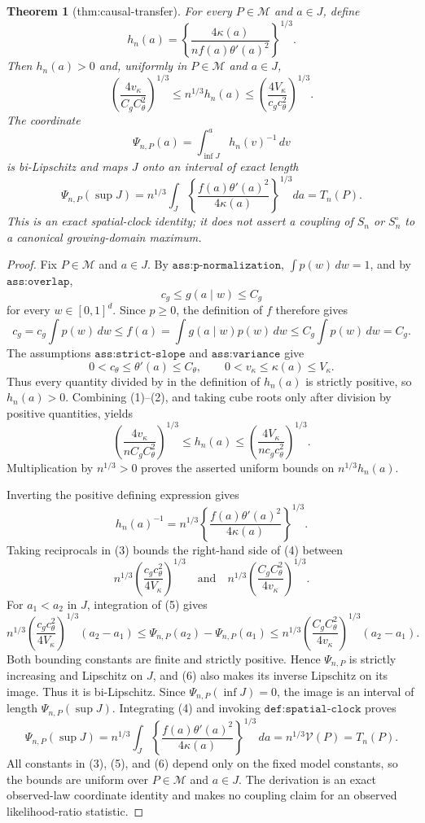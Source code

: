 \documentclass{article}
\newtheorem{theorem}{Theorem}
\begin{document}
\begin{theorem}[thm:causal-transfer]\label{thm:causal-transfer}
For every \(P\in\mathcal M\) and \(a\in J\), define
\[
 h_n(a)=\left\{\frac{4\kappa(a)}{n f(a)\theta'(a)^2}\right\}^{1/3}.
\]
Then \(h_n(a)>0\) and, uniformly in \(P\in\mathcal M\) and \(a\in J\),
\[
 \left(\frac{4v_\kappa}{C_gC_\theta^2}\right)^{1/3}
 \le n^{1/3}h_n(a)
 \le
 \left(\frac{4V_\kappa}{c_gc_\theta^2}\right)^{1/3}.
\]
The coordinate
\[
 \Psi_{n,P}(a)=\int_{\inf J}^{a}h_n(v)^{-1}\,dv
\]
is bi-Lipschitz and maps \(J\) onto an interval of exact length
\[
 \Psi_{n,P}(\sup J)=n^{1/3}\int_J
 \left\{\frac{f(a)\theta'(a)^2}{4\kappa(a)}\right\}^{1/3}da
 =T_n(P).
\]
This is an exact spatial-clock identity; it does not assert a coupling of \(S_n\) or \(S_n^\circ\) to a canonical growing-domain maximum.
\end{theorem}
\begin{proof}
Fix \(P\in\mathcal M\) and \(a\in J\).  By \(\texttt{ass:p-normalization}\), \(\int p(w)\,dw=1\), and by \(\texttt{ass:overlap}\),
\[
 c_g\le g(a\mid w)\le C_g
\]
for every \(w\in[0,1]^d\).  Since \(p\ge0\), the definition of \(f\) therefore gives
\[
 c_g=c_g\int p(w)\,dw
 \le f(a)=\int g(a\mid w)p(w)\,dw
 \le C_g\int p(w)\,dw=C_g. \tag{1}
\]
The assumptions \(\texttt{ass:strict-slope}\) and \(\texttt{ass:variance}\) give
\[
 0<c_\theta\le\theta'(a)\le C_\theta,
 \qquad
 0<v_\kappa\le\kappa(a)\le V_\kappa. \tag{2}
\]
Thus every quantity divided by in the definition of \(h_n(a)\) is strictly positive, so \(h_n(a)>0\).  Combining (1)--(2), and taking cube roots only after division by positive quantities, yields
\[
 \left(\frac{4v_\kappa}{nC_gC_\theta^2}\right)^{1/3}
 \le h_n(a)\le
 \left(\frac{4V_\kappa}{nc_gc_\theta^2}\right)^{1/3}. \tag{3}
\]
Multiplication by \(n^{1/3}>0\) proves the asserted uniform bounds on \(n^{1/3}h_n(a)\).

Inverting the positive defining expression gives
\[
 h_n(a)^{-1}=n^{1/3}
 \left\{\frac{f(a)\theta'(a)^2}{4\kappa(a)}\right\}^{1/3}. \tag{4}
\]
Taking reciprocals in (3) bounds the right-hand side of (4) between
\[
 n^{1/3}\left(\frac{c_gc_\theta^2}{4V_\kappa}\right)^{1/3}
 \quad\text{and}\quad
 n^{1/3}\left(\frac{C_gC_\theta^2}{4v_\kappa}\right)^{1/3}. \tag{5}
\]
For \(a_1<a_2\) in \(J\), integration of (5) gives
\[
 n^{1/3}\left(\frac{c_gc_\theta^2}{4V_\kappa}\right)^{1/3}(a_2-a_1)
 \le \Psi_{n,P}(a_2)-\Psi_{n,P}(a_1)
 \le n^{1/3}\left(\frac{C_gC_\theta^2}{4v_\kappa}\right)^{1/3}(a_2-a_1). \tag{6}
\]
Both bounding constants are finite and strictly positive.  Hence \(\Psi_{n,P}\) is strictly increasing and Lipschitz on \(J\), and (6) also makes its inverse Lipschitz on its image.  Thus it is bi-Lipschitz.  Since \(\Psi_{n,P}(\inf J)=0\), the image is an interval of length \(\Psi_{n,P}(\sup J)\).  Integrating (4) and invoking \(\texttt{def:spatial-clock}\) proves
\[
 \Psi_{n,P}(\sup J)
 =n^{1/3}\int_J
 \left\{\frac{f(a)\theta'(a)^2}{4\kappa(a)}\right\}^{1/3}\,da
 =n^{1/3}\mathcal V(P)=T_n(P). \tag{7}
\]
All constants in (3), (5), and (6) depend only on the fixed model constants, so the bounds are uniform over \(P\in\mathcal M\) and \(a\in J\).  The derivation is an exact observed-law coordinate identity and makes no coupling claim for an observed likelihood-ratio statistic.
\end{proof}
\end{document}
